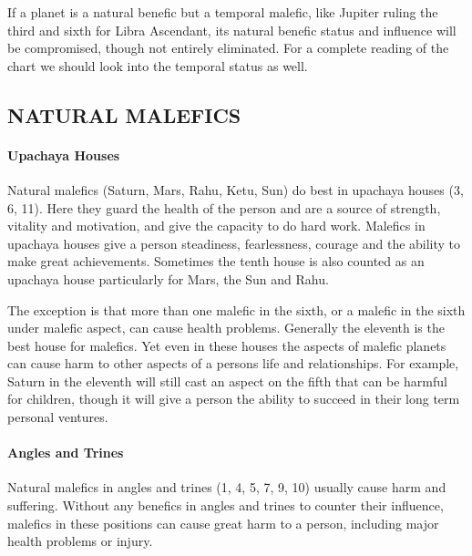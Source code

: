  

If a planet is a natural benefic but a temporal malefic, like Jupiter ruling the third and sixth for Libra Ascendant, its natural benefic status and influence will be compromised, though not entirely eliminated. For a complete reading of the chart we should look into the temporal status as well.

 

\subsection{NATURAL MALEFICS}
 

\paragraph{Upachaya Houses}

 

Natural malefics (Saturn, Mars, Rahu, Ketu, Sun) do best in upachaya houses (3, 6, 11). Here they guard the health of the person and are a source of strength, vitality and motivation, and give the capacity to do hard work. Malefics in upachaya houses give a person steadiness, fearlessness, courage and the ability to make great achievements. Sometimes the tenth house is also counted as an upachaya house particularly for Mars, the Sun and Rahu.

 

The exception is that more than one malefic in the sixth, or a malefic in the sixth under malefic aspect, can cause health problems. Generally the eleventh is the best house for malefics. Yet even in these houses the aspects of malefic planets can cause harm to other aspects of a persons life and relationships. For example, Saturn in the eleventh will still cast an aspect on the fifth that can be harmful for children, though it will give a person the ability to succeed in their long term personal ventures.

 

\paragraph{Angles and Trines}

Natural malefics in angles and trines (1, 4, 5, 7, 9, 10) usually cause harm and suffering. Without any benefics in angles and trines to counter their influence, malefics in these positions can cause great harm to a person, including major health problems or injury.

 

